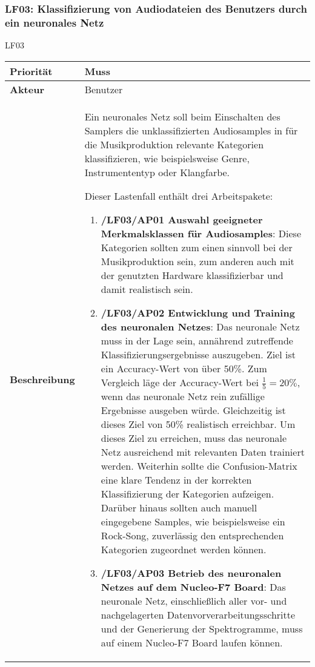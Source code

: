 \subsubsection{LF03: Klassifizierung von Audiodateien des Benutzers durch ein neuronales Netz}
\hypertarget{lf-nn-01}{LF03}

\begin{table}[h!]
	\begin{tabularx}{\textwidth}{|l|X|}
		\hline
		\textbf{Priorität} & Muss \\ \hline
		\textbf{Akteur} & Benutzer \\ \hline
		\textbf{Beschreibung} & Ein neuronales Netz soll beim Einschalten des Samplers die unklassifizierten Audiosamples in für die Musikproduktion relevante Kategorien klassifizieren, wie beispielsweise Genre, Instrumententyp oder Klangfarbe.
		
		Dieser Lastenfall enthält drei Arbeitspakete:
		\begin{enumerate}
    		\item \textbf{/LF03/AP01 Auswahl geeigneter Merkmalsklassen für Audiosamples}: Diese Kategorien sollten zum einen sinnvoll bei der Musikproduktion sein, zum anderen auch mit der genutzten Hardware klassifizierbar und damit realistisch sein.
    		\item \textbf{/LF03/AP02 Entwicklung und Training des neuronalen Netzes}: Das neuronale Netz muss in der Lage sein, annährend zutreffende Klassifizierungsergebnisse auszugeben. Ziel ist ein Accuracy-Wert von über 50\%. Zum Vergleich läge der Accuracy-Wert bei \textit{$\frac{1}{5} = 20\%$}, wenn das neuronale Netz rein zufällige Ergebnisse ausgeben würde. Gleichzeitig ist dieses Ziel von 50\% realistisch erreichbar. Um dieses Ziel zu erreichen, muss das neuronale Netz ausreichend mit relevanten Daten trainiert werden. Weiterhin sollte die Confusion-Matrix eine klare Tendenz in der korrekten Klassifizierung der Kategorien aufzeigen. Darüber hinaus sollten auch manuell eingegebene Samples, wie beispielsweise ein Rock-Song, zuverlässig den entsprechenden Kategorien zugeordnet werden können. 
			\item \textbf{/LF03/AP03 Betrieb des neuronalen Netzes auf dem Nucleo-F7 Board}: Das neuronale Netz, einschließlich aller vor- und nachgelagerten Datenvorverarbeitungsschritte und der Generierung der Spektrogramme, muss auf einem Nucleo-F7 Board laufen können. 
		\end{enumerate}
		\\ \hline
	\end{tabularx}
\end{table}